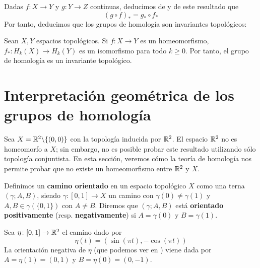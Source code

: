 Dadas $f\colon X \to Y$ y
$g\colon Y \to Z$ continuas, deducimos de  y de este resultado que
\[(g\circ f)_*=g_*\circ f_*\]
Por tanto, deducimos que los grupos de homología son invariantes topológicos:

\begin{theorem}
Sean $X,Y$ espacios topológicos. Si $f\colon X \to Y$ es un homeomorfismo, $f_*\colon H_k(X) \to H_k(Y)$ es un isomorfismo para todo $k \geq 0$. Por tanto, el
grupo de homología es un invariante topológico.
\end{theorem}

\section{Interpretación geométrica de los grupos de homología}
Sea $X=\mathbb{R}^2\backslash\{(0,0)\}$ con la topología inducida por $\mathbb{R}^2$. El
espacio $\mathbb{R}^2$ no es homeomorfo a $X$; sin embargo, no es posible probar
este resultado utilizando sólo topología conjuntista. En esta sección, veremos
cómo la teoría de homología nos permite probar que no existe un homeomorfismo
entre $\mathbb{R}^2$ y $X$.

Definimos un \textbf{camino orientado} en un espacio topológico $X$ como una
terna $(\gamma; A,B)$, siendo $\gamma\colon [0,1] \to X$ un camino
con $\gamma(0)\neq \gamma(1)$ y $A,B \in \gamma(\{0,1\})$ con $A\neq B$. Diremos
que $(\gamma; A,B)$ está \textbf{orientado positivamente} (resp.
\textbf{negativamente}) si $A=\gamma(0)$ y $B=\gamma(1)$.

\begin{example}
Sea $\eta\colon [0,1] \to \mathbb{R}^2$ el camino dado por
\[\eta(t)=(\sin(\pi t),-\cos(\pi t))\]
La orientación negativa de $\eta$ (que podemos ver en
) viene dada por $A=\eta(1)=(0,1)$ y $B=\eta(0)=(0,-1)$.
\end{example}


